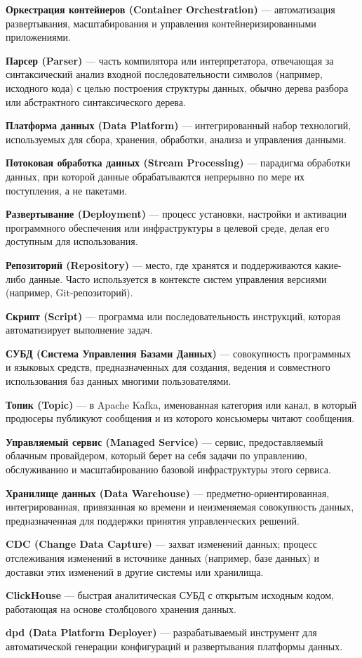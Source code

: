 \textbf{Оркестрация контейнеров (Container Orchestration)} --- автоматизация развертывания, масштабирования и управления контейнеризированными приложениями.

\textbf{Парсер (Parser)} --- часть компилятора или интерпретатора, отвечающая за синтаксический анализ входной последовательности символов (например, исходного кода) с целью построения структуры данных, обычно дерева разбора или абстрактного синтаксического дерева.

\textbf{Платформа данных (Data Platform)} --- интегрированный набор технологий, используемых для сбора, хранения, обработки, анализа и управления данными.

\textbf{Потоковая обработка данных (Stream Processing)} --- парадигма обработки данных, при которой данные обрабатываются непрерывно по мере их поступления, а не пакетами.

\textbf{Развертывание (Deployment)} --- процесс установки, настройки и активации программного обеспечения или инфраструктуры в целевой среде, делая его доступным для использования.

\textbf{Репозиторий (Repository)} --- место, где хранятся и поддерживаются какие-либо данные. Часто используется в контексте систем управления версиями (например, Git-репозиторий).

\textbf{Скрипт (Script)} --- программа или последовательность инструкций, которая автоматизирует выполнение задач.

\textbf{СУБД (Система Управления Базами Данных)} --- совокупность программных и языковых средств, предназначенных для создания, ведения и совместного использования баз данных многими пользователями.

\textbf{Топик (Topic)} --- в Apache Kafka, именованная категория или канал, в который продюсеры публикуют сообщения и из которого консьюмеры читают сообщения.

\textbf{Управляемый сервис (Managed Service)} --- сервис, предоставляемый облачным провайдером, который берет на себя задачи по управлению, обслуживанию и масштабированию базовой инфраструктуры этого сервиса.

\textbf{Хранилище данных (Data Warehouse)} --- предметно-ориентированная, интегрированная, привязанная ко времени и неизменяемая совокупность данных, предназначенная для поддержки принятия управленческих решений.

\textbf{CDC (Change Data Capture)} --- захват изменений данных; процесс отслеживания изменений в источнике данных (например, базе данных) и доставки этих изменений в другие системы или хранилища.

\textbf{ClickHouse} --- быстрая аналитическая СУБД с открытым исходным кодом, работающая на основе столбцового хранения данных.

\textbf{dpd (Data Platform Deployer)} --- разрабатываемый инструмент для автоматической генерации конфигураций и развертывания платформы данных.
